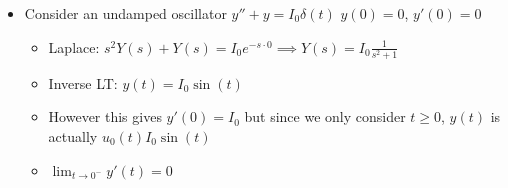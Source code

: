 \documentclass[12pt]{article}
\begin{document}
\begin{itemize}
    \item Consider an undamped oscillator $y'' + y = I_0 \delta(t)$ $y(0) = 0$, $y'(0) = 0$ \begin{itemize}
        \item Laplace: $s^2 Y(s) + Y(s) = I_0 e^{-s \cdot 0} \implies Y(s) = I_0 \frac{1}{s^2+1}$
        \item Inverse LT: $y(t) = I_0 \sin (t)$
        \item However this gives $y'(0) = I_0$ but since we only consider $t \geq 0$, $y(t)$ is actually  $u_0 (t) I_0 \sin(t)$
        \item $\lim_{t \rightarrow 0^{-}} y'(t) = 0$
    \end{itemize}
\end{itemize}
\end{document}
